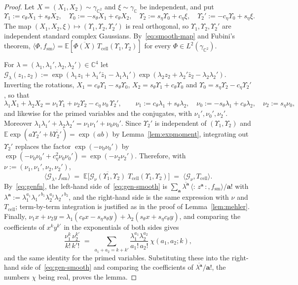 \documentclass[11pt,reqno]{amsart}
\theoremstyle{definition}
\numberwithin{equation}{section}
\newcommand{\C}{\mathbb{C}}
\newcommand{\E}{\mathbb{E}}
\newcommand{\gC}{\gamma_{\C}}
\newcommand{\gCC}{\gamma_{\C^2}}
\newcommand{\wick}[1]{{:}\,#1\,{:}}
\newcommand{\Tcell}{T_{\mathrm{cell}}}
\newcommand{\fsm}{f_{\mathrm{sm}}}
\begin{document}
\begin{proof}
Let $X=(X_1,X_2)\sim\gCC$ and $\xi\sim\gC$ be independent, and put
\[
  \Upsilon_1:=c_\theta X_1+s_\theta X_2,\quad \Upsilon_0:=-s_\theta X_1+c_\theta X_2,\quad \Upsilon_2:=s_\eta \Upsilon_0+c_\eta\xi,\quad \Upsilon_2':=-c_\eta \Upsilon_0+s_\eta\xi .
\]
The map $(X_1,X_2,\xi)\mapsto(\Upsilon_1,\Upsilon_2,\Upsilon_2')$ is real orthogonal, so $\Upsilon_1,\Upsilon_2,\Upsilon_2'$ are independent standard complex Gaussians. By~\eqref{eq:smooth-map} and Fubini's theorem, $\langle\Phi,\fsm\rangle=\E[\overline{\Phi(X)}\,\Tcell(\Upsilon_1,\Upsilon_2)]$ for every $\Phi\in L^2(\gCC)$.

For $\lambda=(\lambda_1,\lambda_1',\lambda_2,\lambda_2')\in\C^4$ let $\mathcal{G}_\lambda(z_1,z_2):=\exp(\lambda_1z_1+\lambda_1'\bar z_1-\lambda_1\lambda_1')\exp(\lambda_2z_2+\lambda_2'\bar z_2-\lambda_2\lambda_2')$. Inverting the rotations, $X_1=c_\theta \Upsilon_1-s_\theta \Upsilon_0$, $X_2=s_\theta \Upsilon_1+c_\theta \Upsilon_0$ and $\Upsilon_0=s_\eta \Upsilon_2-c_\eta \Upsilon_2'$, so that
\[
  \lambda_1X_1+\lambda_2X_2=\nu_1\Upsilon_1+\nu_2\Upsilon_2-c_\eta\,\nu_0\,\Upsilon_2',\qquad
  \nu_1:=c_\theta\lambda_1+s_\theta\lambda_2,\quad \nu_0:=-s_\theta\lambda_1+c_\theta\lambda_2,\quad\nu_2:=s_\eta\nu_0 ,
\]
and likewise for the primed variables and the conjugates, with $\nu_1',\nu_0',\nu_2'$. Moreover $\lambda_1\lambda_1'+\lambda_2\lambda_2'=\nu_1\nu_1'+\nu_0\nu_0'$. Since $\Upsilon_2'$ is independent of $(\Upsilon_1,\Upsilon_2)$ and $\E\exp(a\Upsilon_2'+b\overline{\Upsilon_2'})=\exp(ab)$ by Lemma~\ref{lem:expmoment}, integrating out $\Upsilon_2'$ replaces the factor $\exp(-\nu_0\nu_0')$ by $\exp(-\nu_0\nu_0'+c_\eta^2\nu_0\nu_0')=\exp(-\nu_2\nu_2')$. Therefore, with $\nu:=(\nu_1,\nu_1',\nu_2,\nu_2')$,
\begin{equation}\label{eq:gen-smooth}
  \langle \mathcal{G}_\lambda,\fsm\rangle\;=\;\E\bigl[\overline{\mathcal{G}_\nu(\Upsilon_1,\Upsilon_2)}\;\Tcell(\Upsilon_1,\Upsilon_2)\bigr]\;=\;\langle \mathcal{G}_\nu,\Tcell\rangle .
\end{equation}
By~\eqref{eq:genfn}, the left-hand side of~\eqref{eq:gen-smooth} is $\sum_{\mathbf{a}}\overline{\lambda^{\mathbf{a}}}\,\langle\wick{z^{\mathbf{a}}},\fsm\rangle/\mathbf{a}!$ with $\lambda^{\mathbf{a}}:=\lambda_1^{a_1}\lambda_1'^{\,b_1}\lambda_2^{a_2}\lambda_2'^{\,b_2}$, and the right-hand side is the same expression with $\nu$ and $\Tcell$; term-by-term integration is justified as in the proof of Lemma~\ref{lem:mehler}. Finally, $\nu_1x+\nu_2y=\lambda_1(c_\theta x-s_\eta s_\theta y)+\lambda_2(s_\theta x+s_\eta c_\theta y)$, and comparing the coefficients of $x^ky^{k'}$ in the exponentials of both sides gives
\[
  \frac{\nu_1^{k}\,\nu_2^{k'}}{k!\,k'!}\;=\;\sum_{a_1+a_2=k+k'}\frac{\lambda_1^{a_1}\lambda_2^{a_2}}{a_1!\,a_2!}\ \chi(a_1,a_2;k),
\]
and the same identity for the primed variables. Substituting these into the right-hand side of~\eqref{eq:gen-smooth} and comparing the coefficients of $\overline{\lambda^{\mathbf{a}}}/\mathbf{a}!$, the numbers $\chi$ being real, proves the lemma.
\end{proof}
\end{document}
